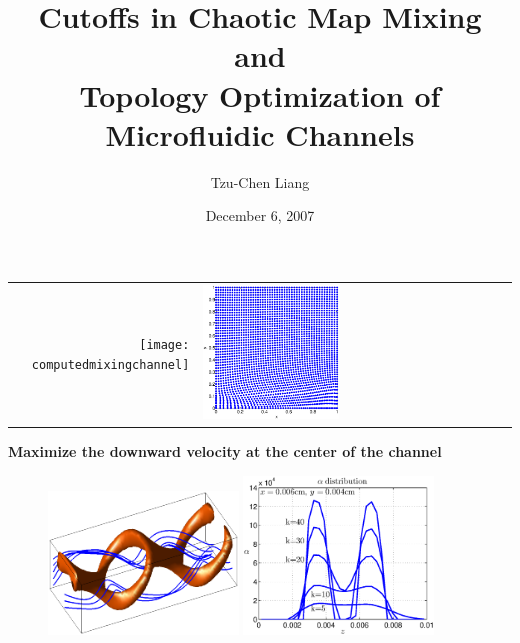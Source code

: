 \documentclass[12pt,t]{beamer}
\begin{document}
\title[Optimal Microfluidic Mixing and Cutoff]{Cutoffs in Chaotic Map Mixing and \\Topology Optimization of Microfluidic Channels}
\author{Tzu-Chen Liang}
 
\date{December 6, 2007}
\frame{\titlepage}



\begin{frame}
\begin{tabular}{rl}
\texttt{[image: computedmixingchannel]}&
\includegraphics[width=0.45\textwidth,trim=1cm 1cm 0cm 0cm]{mappedpoints}
\end{tabular}
\end{frame}
\begin{frame}
\begin{example}{\bfseries Maximize the downward velocity at the center of the channel}
  \begin{figure}
    \centerline{
      \includegraphics[width=0.45\textwidth]{example1structure2}
       \includegraphics[width=0.45\textwidth]{example1alphaevolve}
    }
  \end{figure}
\end{example}
\end{frame}
\end{document}
